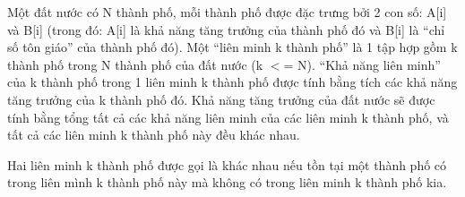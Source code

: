 Một đất nước có N thành phố, mỗi thành phố được đặc trưng bởi 2 con số: A[i] và B[i] (trong đó: A[i] là khả năng tăng trưởng của thành phố đó và B[i] là “chỉ số tôn giáo” của thành phố đó). Một “liên minh k thành phố” là 1 tập hợp gồm k thành phố trong N thành phố của đất nước (k $<$= N). “Khả năng liên minh” của k thành phố trong 1 liên minh k thành phố được tính bằng tích các khả năng tăng trưởng của k thành phố đó. Khả năng tăng trưởng của đất nước sẽ được tính bằng tổng tất cả các khả năng liên minh của các liên minh k thành phố, và tất cả các liên minh k thành phố này đều khác nhau.

Hai liên minh k thành phố được gọi là khác nhau nếu tồn tại một thành phố có trong liên mình k thành phố này mà không có trong liên minh k thành phố kia.